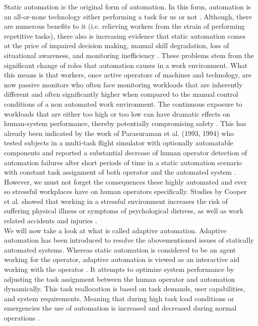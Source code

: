 Static automation is the original form of automation. In this form, automation is an all-or-none technology either performing a task for us or not \cite{Byrne1996}.
Although, there are numerous benefits to it (i.e. relieving workers from the strain of performing repetitive tasks), there also is increasing evidence that static automation comes at the price of impaired decision making, manual skill degradation, loss of situational awareness, and monitoring inefficiency \cite{Byrne1996}.
These problems stem from the significant change of roles that automation causes in a work environment. What this means is that workers, once active operators of machines and technology, are now passive monitors who often face monitoring workloads that are inherently different and often significantly higher when compared to the manual control conditions of a non automated work environment. The continuous exposure to workloads that are either too high or too low can have dramatic effects on human-system performance, thereby potentially compromising safety \cite{Mehta2013}. This has already been indicated by the work of Parasuraman et al. (1993, 1994) who tested subjects in a multi-task flight simulator with optionally automatable components and reported a substantial decrease of human operator detection of automation failures after short periods of time in a static automation scenario with constant task assignment of both operator and the automated system \cite{Byrne1996}.
However, we must not forget the consequences these highly automated and ever so stressful workplaces have on human operators specifically. Studies by Cooper et al. showed that working in a stressful environment increases the risk of suffering physical illness or symptoms of psychological distress, as well as work related accidents and injuries \cite{Clarke2004}.\\
We will now take a look at what is called adaptive automation. Adaptive automation has been introduced to resolve the abovementioned issues of statically automated systems.
Whereas static automation is considered to be an agent working for the operator, adaptive automation is viewed as an interactive aid working with the operator \cite{Byrne1996}. It attempts to optimize system performance by adjusting the task assignment between the human operator and automation dynamically. This task reallocation is based on task demands, user capabilities, and system requirements. Meaning that during high task load conditions or emergencies the use of automation is increased and decreased during normal operations \cite{Mehta2013}.
